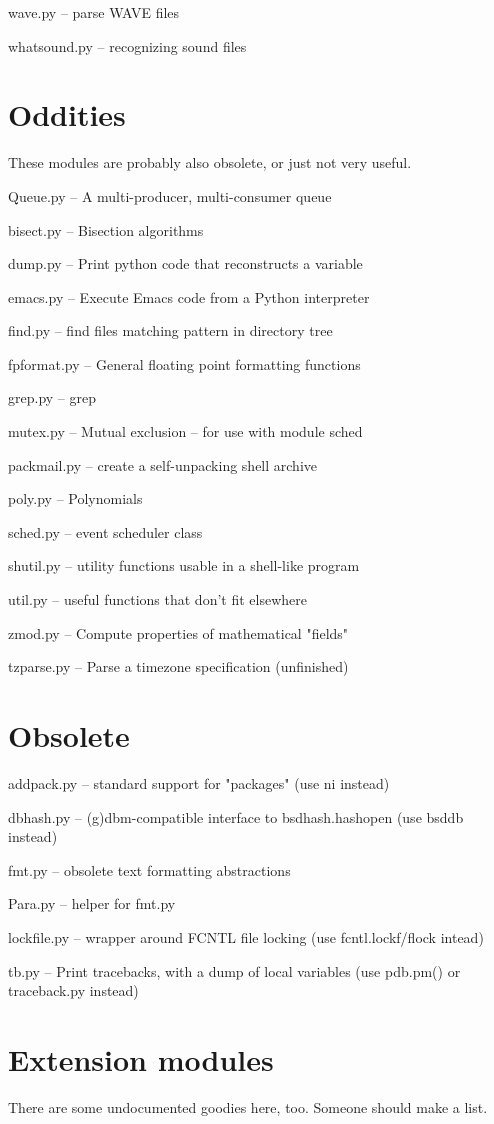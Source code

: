wave.py -- parse WAVE files

whatsound.py -- recognizing sound files


\section{Oddities}

These modules are probably also obsolete, or just not very useful.

Queue.py -- A multi-producer, multi-consumer queue

bisect.py -- Bisection algorithms

dump.py -- Print python code that reconstructs a variable

emacs.py -- Execute Emacs code from a Python interpreter

find.py -- find files matching pattern in directory tree

fpformat.py -- General floating point formatting functions

grep.py -- grep

mutex.py -- Mutual exclusion -- for use with module sched

packmail.py -- create a self-unpacking shell archive

poly.py -- Polynomials

sched.py -- event scheduler class

shutil.py -- utility functions usable in a shell-like program

util.py -- useful functions that don't fit elsewhere

zmod.py -- Compute properties of mathematical "fields"

tzparse.py -- Parse a timezone specification (unfinished)


\section{Obsolete}

addpack.py -- standard support for "packages" (use ni instead)

dbhash.py -- (g)dbm-compatible interface to bsdhash.hashopen (use
bsddb instead)

fmt.py -- obsolete text formatting abstractions

Para.py -- helper for fmt.py

lockfile.py -- wrapper around FCNTL file locking (use
fcntl.lockf/flock intead)

tb.py -- Print tracebacks, with a dump of local variables (use
pdb.pm() or traceback.py instead)


\section{Extension modules}

There are some undocumented goodies here, too.  Someone should make a
list.
